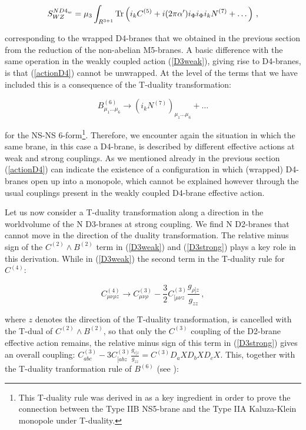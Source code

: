 \documentclass[12pt,a4paper]{article}
\begin{document}
\begin{equation}
\label{actionD4}
S^{ND4_w}_{WZ}=\mu_3\int_{R^{3+1}}{\rm Tr}\left(i_k C^{(5)}+
i(2\pi\alpha^\prime)i_\Phi i_\Phi i_k N^{(7)}+\dots\right)\, ,
\end{equation}

\noindent corresponding to the wrapped D4-branes that we obtained
in the previous section from the reduction of the non-abelian
M5-branes.
A basic difference with the same operation in
the weakly coupled action (\ref{D3weak}), giving rise to D4-branes,
is that (\ref{actionD4}) cannot be unwrapped. At the level of the
terms that we have included this is a consequence of the T-duality
transformation:

\begin{equation}
\label{BN}
B^{(6)}_{\mu_1\dots\mu_6}\rightarrow (i_k N^{(7)})_{\mu_1\dots\mu_6}
+\dots
\end{equation}

\noindent for the NS-NS 6-form\footnote{This T-duality rule was derived
in \cite{EJL} as a key ingredient in order to prove the connection
between the Type IIB NS5-brane and the Type IIA Kaluza-Klein 
monopole under T-duality.}.
Therefore, we encounter again the situation in which the
same brane, in this case a D4-brane, is described by different
effective actions at weak and strong couplings.
As we mentioned already in the previous section  
(\ref{actionD4}) can indicate the existence of
a configuration in which (wrapped) D4-branes open up into a 
monopole, which cannot be explained however through the usual
couplings present in the weakly coupled D4-brane effective action.

Let us now consider a T-duality transformation
along a direction in the worldvolume of the N D3-branes at
strong coupling. We find N D2-branes that cannot move in the
direction of the duality transformation.
The relative minus sign of the $C^{(2)}\wedge B^{(2)}$ term
in (\ref{D3weak}) and (\ref{D3strong}) plays a key role in this
derivation. While in (\ref{D3weak})
the second term in the T-duality rule for $C^{(4)}$:

\begin{equation}
C^{(4)}_{\mu\nu\rho z}\rightarrow C^{(3)}_{\mu\nu\rho}-\frac32 
C^{(3)}_{[\mu\nu z}\frac{g_{\rho]z}}{g_{zz}}\, ,
\end{equation}

\noindent where $z$ denotes the direction of the T-duality
transformation,
is cancelled with the T-dual of $C^{(2)}\wedge B^{(2)}$, 
so that only the $C^{(3)}$ coupling of the D2-brane effective action
remains, the relative
minus sign of this term in (\ref{D3strong}) gives an overall
coupling: 
$C^{(3)}_{abc}-3 C^{(3)}_{[abz}\frac{g_{c]z}}{g_{zz}}=
C^{(3)}D_aXD_bXD_cX$. This, together with
the T-duality tranformation rule of $B^{(6)}$ (see \cite{EJL}):
\end{document}
